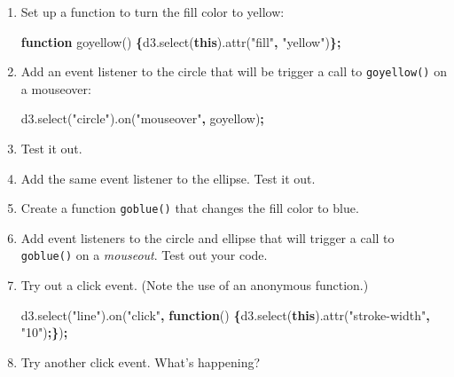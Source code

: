 \documentclass[openany]{book}
\newenvironment{Shaded}{\begin{snugshade}}{\end{snugshade}}
\newcommand{\AttributeTok}[1]{\textcolor[rgb]{0.77,0.63,0.00}{#1}}
\newcommand{\KeywordTok}[1]{\textcolor[rgb]{0.13,0.29,0.53}{\textbf{#1}}}
\newcommand{\NormalTok}[1]{#1}
\newcommand{\OperatorTok}[1]{\textcolor[rgb]{0.81,0.36,0.00}{\textbf{#1}}}
\newcommand{\StringTok}[1]{\textcolor[rgb]{0.31,0.60,0.02}{#1}}
\newcommand{\VariableTok}[1]{\textcolor[rgb]{0.00,0.00,0.00}{#1}}
\begin{document}
\begin{enumerate}
\def\labelenumi{\arabic{enumi}.}
\item
  Set up a function to turn the fill color to yellow:

\begin{Shaded}
\begin{Highlighting}[]
\KeywordTok{function} \AttributeTok{goyellow}\NormalTok{() }\OperatorTok{\{}\VariableTok{d3}\NormalTok{.}\AttributeTok{select}\NormalTok{(}\KeywordTok{this}\NormalTok{).}\AttributeTok{attr}\NormalTok{(}\StringTok{"fill"}\OperatorTok{,} \StringTok{"yellow"}\NormalTok{)}\OperatorTok{\};}
\end{Highlighting}
\end{Shaded}
\item
  Add an event listener to the circle that will be trigger a call to \texttt{goyellow()} on a mouseover:

\begin{Shaded}
\begin{Highlighting}[]
\VariableTok{d3}\NormalTok{.}\AttributeTok{select}\NormalTok{(}\StringTok{"circle"}\NormalTok{).}\AttributeTok{on}\NormalTok{(}\StringTok{"mouseover"}\OperatorTok{,}\NormalTok{ goyellow)}\OperatorTok{;}
\end{Highlighting}
\end{Shaded}
\item
  Test it out.
\item
  Add the same event listener to the ellipse. Test it out.
\item
  Create a function \texttt{goblue()} that changes the fill color to blue.
\item
  Add event listeners to the circle and ellipse that will trigger a call to \texttt{goblue()} on a \emph{mouseout}. Test out your code.
\item
  Try out a click event. (Note the use of an anonymous function.)

\begin{Shaded}
\begin{Highlighting}[]
\VariableTok{d3}\NormalTok{.}\AttributeTok{select}\NormalTok{(}\StringTok{"line"}\NormalTok{).}\AttributeTok{on}\NormalTok{(}\StringTok{"click"}\OperatorTok{,} \KeywordTok{function}\NormalTok{()}
  \OperatorTok{\{}\VariableTok{d3}\NormalTok{.}\AttributeTok{select}\NormalTok{(}\KeywordTok{this}\NormalTok{).}\AttributeTok{attr}\NormalTok{(}\StringTok{"stroke-width"}\OperatorTok{,} \StringTok{"10"}\NormalTok{)}\OperatorTok{;\}}\NormalTok{)}\OperatorTok{;}
\end{Highlighting}
\end{Shaded}
\item
  Try another click event. What's happening?


\end{enumerate}
\end{document}
